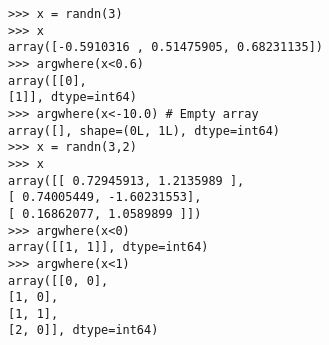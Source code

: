\begin{framed}
\begin{verbatim}
>>> x = randn(3)
>>> x
array([-0.5910316 , 0.51475905, 0.68231135])
>>> argwhere(x<0.6)
array([[0],
[1]], dtype=int64)
>>> argwhere(x<-10.0) # Empty array
array([], shape=(0L, 1L), dtype=int64)
>>> x = randn(3,2)
>>> x
array([[ 0.72945913, 1.2135989 ],
[ 0.74005449, -1.60231553],
[ 0.16862077, 1.0589899 ]])
>>> argwhere(x<0)
array([[1, 1]], dtype=int64)
>>> argwhere(x<1)
array([[0, 0],
[1, 0],
[1, 1],
[2, 0]], dtype=int64)

\end{verbatim}
\end{framed}

